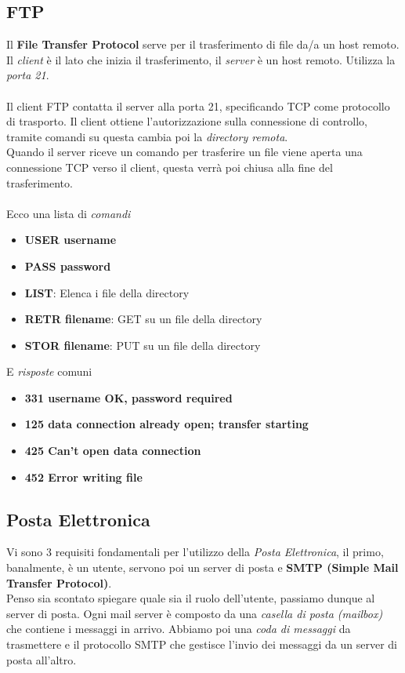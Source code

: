\documentclass{article}
\begin{document}
        \subsection{FTP}
            Il \textbf{File Transfer Protocol} serve per il trasferimento di file da/a un host remoto.\\
            Il \textit{client} è il lato che inizia il trasferimento, il \textit{server} è un host remoto. Utilizza la \textit{porta 21}.\\
            \\
            Il client FTP contatta il server alla porta 21, specificando TCP come protocollo di trasporto. Il client ottiene l'autorizzazione sulla connessione di controllo, tramite comandi su questa cambia poi la \textit{directory remota}.\\
            Quando il server riceve un comando per trasferire un file viene aperta una connessione TCP verso il client, questa verrà poi chiusa alla fine del trasferimento.\\
            \\
            Ecco una lista di \textit{comandi}
            \begin{itemize}
                \item \textbf{USER username}
                \item \textbf{PASS password}
                \item \textbf{LIST}: Elenca i file della directory
                \item \textbf{RETR filename}: GET su un file della directory
                \item \textbf{STOR filename}: PUT su un file della directory
            \end{itemize}
            E \textit{risposte} comuni
            \begin{itemize}
                \item \textbf{331 username OK, password required}
                \item \textbf{125 data connection already open; transfer starting}
                \item \textbf{425 Can't open data connection}
                \item \textbf{452 Error writing file}
            \end{itemize}   

        \subsection{Posta Elettronica}
            Vi sono 3 requisiti fondamentali per l'utilizzo della \textit{Posta Elettronica}, il primo, banalmente, è un utente, servono poi un server di posta e \textbf{SMTP (Simple Mail Transfer Protocol)}.\\
            Penso sia scontato spiegare quale sia il ruolo dell'utente, passiamo dunque al server di posta. Ogni mail server è composto da una \textit{casella di posta (mailbox)} che contiene i messaggi in arrivo. Abbiamo poi una \textit{coda di messaggi} da trasmettere e il protocollo SMTP che gestisce l'invio dei messaggi da un server di posta all'altro.
            
\end{document}

